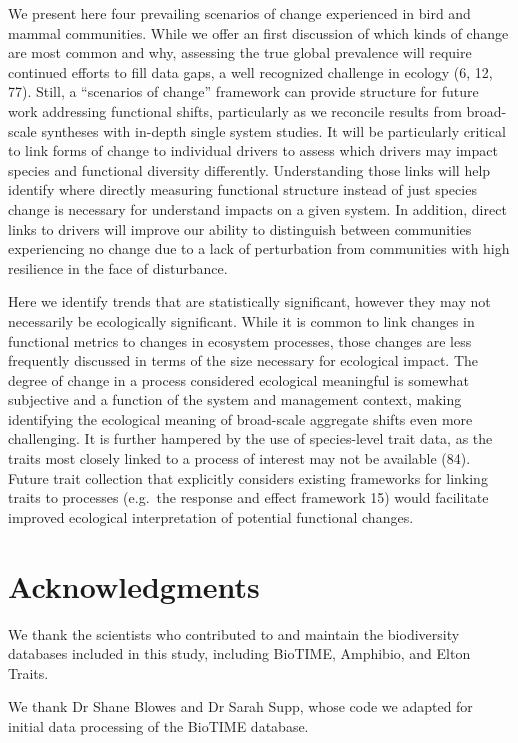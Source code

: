 \documentclass{article}
\begin{document}
We present here four prevailing scenarios of change experienced in bird
and mammal communities. While we offer an first discussion of which
kinds of change are most common and why, assessing the true global
prevalence will require continued efforts to fill data gaps, a well
recognized challenge in ecology (6, 12, 77). Still, a ``scenarios of
change'' framework can provide structure for future work addressing
functional shifts, particularly as we reconcile results from broad-scale
syntheses with in-depth single system studies. It will be particularly
critical to link forms of change to individual drivers to assess which
drivers may impact species and functional diversity differently.
Understanding those links will help identify where directly measuring
functional structure instead of just species change is necessary for
understand impacts on a given system. In addition, direct links to
drivers will improve our ability to distinguish between communities
experiencing no change due to a lack of perturbation from communities
with high resilience in the face of disturbance.

Here we identify trends that are statistically significant, however they
may not necessarily be ecologically significant. While it is common to
link changes in functional metrics to changes in ecosystem processes,
those changes are less frequently discussed in terms of the size
necessary for ecological impact. The degree of change in a process
considered ecological meaningful is somewhat subjective and a function
of the system and management context, making identifying the ecological
meaning of broad-scale aggregate shifts even more challenging. It is
further hampered by the use of species-level trait data, as the traits
most closely linked to a process of interest may not be available (84).
Future trait collection that explicitly considers existing frameworks
for linking traits to processes (e.g.~the response and effect framework
15) would facilitate improved ecological interpretation of potential
functional changes.

\hypertarget{acknowledgments}{%
\section{Acknowledgments}\label{acknowledgments}}

We thank the scientists who contributed to and maintain the biodiversity
databases included in this study, including BioTIME, Amphibio, and Elton
Traits.

We thank Dr Shane Blowes and Dr Sarah Supp, whose code we adapted for
initial data processing of the BioTIME database.
\end{document}
